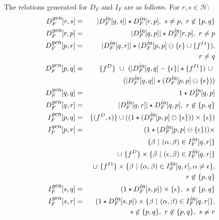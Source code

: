 \documentclass[letterpaper]{sig-alternate}
\newcommand{\p}{\ensuremath{p}}
\newcommand{\q}{\ensuremath{q}}
\newcommand{\s}{\ensuremath{s}}
\newcommand{\myr}{\ensuremath{r}}
\newcommand{\drct}{\ensuremath{D}}
\newcommand{\indrct}{\ensuremath{I}}
\newcommand{\heap}{\ensuremath{\mathcal{H}}}
\newcommand{\epsilonset}{\ensuremath{\{\epsilon\}}}
\newcommand{\din}{\mbox{\footnotesize\em in}}
\newcommand{\dgen}{\mbox{\footnotesize\em gen}}
\newcommand{\num}[1]{\ensuremath{|#1|}}
\newcommand{\remOne}[2]{\ensuremath{#1 \ominus #2}}
\newcommand{\fieldD}[2]{\ensuremath{{#1}_{#2}^\drct}}
\newcommand{\fieldI}[3]{\ensuremath{{#1}_{#2}^{\indrct#3}}}
\begin{document}
\begin{enumerate}
The relations generated for $D_F$ and $I_F$ are as follows. 
For $\myr, \s \in \heap$:
\begin{eqnarray*}
  D_F^{\dgen}[\myr, \s] &=& \num{D_F^{\din}[\q, \s]} \star
  D_F^{\din}[\myr, \p],\ \s \not= \p,\ \myr \not\in
  \{\p, \q\}\\ 
  D_F^{\dgen}[\myr, \p] &=& \num{D_F^{\din}[\q,\p]} \star
  D_F^{\din}[\myr, \p], \ \myr \not= \p\\
 D_F^{\dgen}[\p, \myr] &=& \num{D_F^{\din}[\q, \myr]} \star
 (\remOne{D_F^{\din}[\p, \p]}{\epsilonset} \cup \{f^{\indrct
   1}\}),\\ 
   && \qquad \qquad \myr \not= \q \\ 
  D_F^{\dgen}[\p, \q] &=&
  \{\fieldD{f}{}\}\ \cup\ (\num{D_F^{\din}[\q, \q] -
    \epsilonset} \star
  \{\fieldI{f}{}{1}\})\ \cup\ \\
  && (\num{D_F^{\din}[\q, \q]} \star ( \remOne{D_F^{\din}[\p, \p]}{\epsilonset})) \\ 
  D_F^{\dgen}[\q, \q] &=& 1 \star D_F^{\din}[\q, \p] \\
  D_F^{\dgen}[\q, \myr] &=& \num{D_F^{\din}[\q, \myr]} \star
  D_F^{\din}[\q, \p],\ \myr \not\in \{\p,
  \q\} \\ 
  I_F^{\dgen}[\p, \q] &=& \{(\fieldD{f}{}, \epsilon)\}
  \cup ((1 \star (\remOne{D_F^{\din}[\p,
      \p]}{\epsilonset})) \times \epsilonset) \\	 
  I_F^{\dgen}[\p, \myr] &=& 
  (1 \star (\remOne{D_F^{\din}[\p, \p]}{\epsilonset})) \times \\
  && \{\beta\ \vert\ (\alpha, \beta) \in I_F^{\din}[\q, \myr] \}
  \\
  && \cup\ \{f^\drct\} \times 
  \{\beta\ \vert\ (\epsilon, \beta) \in I_F^{\din}[\q, \myr] \}
  \\
  && \cup\ \{f^{\indrct 1}\} \times 
  \{\beta\ \vert\ (\alpha, \beta) \in I_F^{\din}[\q, \myr],
  \alpha \not= \epsilon \},\\ 
  && \qquad \qquad \myr \not\in \{\p, \q\} \\
  I_F^{\dgen}[\s, \q] &=& (1 \star D_F^{\din}[\s, \p]) \times
  \epsilonset,\ \s \not\in \{\p, \q\} \\ 
  I_F^{\dgen}[\s, \myr] &=& (1 \star D_F^{\din}[\s, \p])
  \times \{\beta\ \vert\ (\alpha, \beta) \in I_F^{\din}[\q,
    \myr]\},\\ 
	&& \qquad \qquad \s \not\in \{\p, \q\},\ \myr \not\in \{\p,
  \q\},\ \s \not= \myr 
\end{eqnarray*}


\end{enumerate}
\end{document}
